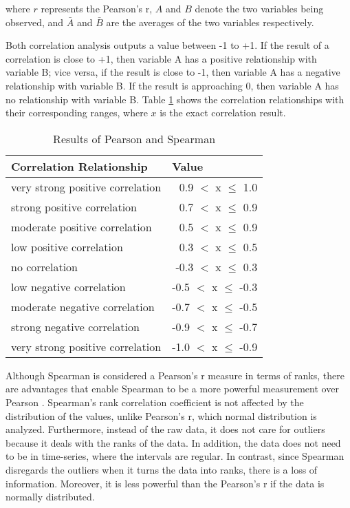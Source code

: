 \noindent where $r$ represents the Pearson’s r, $A$ and $B$ denote the two variables being observed, and $\bar{A}$ and $\bar{B}$ are the averages of the two variables respectively. 

Both correlation analysis outputs a value between -1 to +1. If the result of a correlation is close to +1, then variable A has a positive relationship with variable B; vice versa, if the result is close to -1, then variable A has a negative relationship with variable B. If the result is approaching 0, then variable A has no relationship with variable B. Table \ref{table:correlation-results} shows the correlation relationships with their corresponding ranges, where $x$ is the exact correlation result. 


\begin{table}[h]
\centering
\caption{Results of Pearson and Spearman}
\label{table:correlation-results}
\begin{tabular}{|l|r|}
\hline
Correlation Relationship         & \multicolumn{1}{l|}{Value}        \\ \hline
very strong positive correlation & 0.9 $<$ x $\leq$ 1.0   \\ \hline
strong positive correlation      & 0.7 $<$ x $\leq$ 0.9   \\ \hline
moderate positive correlation    & 0.5 $<$ x $\leq$ 0.9   \\ \hline
low positive correlation         & 0.3 $<$ x $\leq$ 0.5   \\ \hline
no correlation                   & -0.3 $<$ x $\leq$ 0.3  \\ \hline
low negative correlation         & -0.5 $<$ x $\leq$ -0.3 \\ \hline
moderate negative correlation    & -0.7 $<$ x $\leq$ -0.5 \\ \hline
strong negative correlation      & -0.9 $<$ x $\leq$ -0.7 \\ \hline
very strong positive correlation & -1.0 $<$ x $\leq$ -0.9 \\ \hline
\end{tabular}
\end{table}

Although Spearman is considered a Pearson’s r measure in terms of ranks, there are advantages that enable Spearman to be a more powerful measurement over Pearson . Spearman’s rank correlation coefficient is not affected by the distribution of the values, unlike Pearson’s r, which normal distribution is analyzed. Furthermore, instead of the raw data, it does not care for outliers because it deals with the ranks of the data. In addition, the data does not need to be in time-series, where the intervals are regular. In contrast, since Spearman disregards the outliers when it turns the data into ranks, there is a loss of information. Moreover, it is less powerful than the Pearson’s r if the data is normally distributed.





